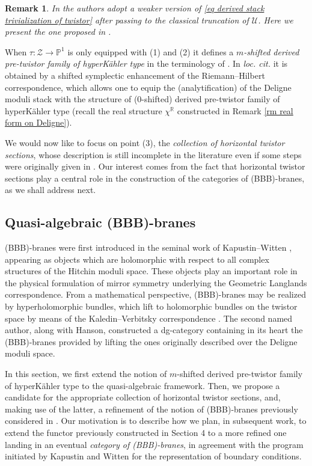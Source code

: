 \documentclass[11pt, a4paper]{amsart}
\numberwithin{equation}{section}
\newtheorem{remark}[theorem]{Remark}
\theoremstyle{definition}
\theoremstyle{remark}
\newcommand{\Uu}{\mathcal{U}}
\newcommand{\Zz}{\mathcal{Z}}
\newcommand{\RR}{\mathbb{R}}
\newcommand{\PP}{\mathbb{P}}
\renewcommand{\to}{\longrightarrow}
\begin{document}
\begin{remark}
In \cite{kryczka&tannaka&yau} the authors adopt a weaker version of \eqref{eq derived stack trivialization of twistor} after passing to the classical truncation of $\Uu$. Here we present the one proposed in \cite{KPS}.
\end{remark}


When $\tau : \Zz \to \PP^1$ is only equipped with (1) and (2) it defines a {\it $m$-shifted derived pre-twistor family of hyperKähler type} in the terminology of \cite{kryczka&tannaka&yau}. In {\it loc. cit.} it is obtained by a shifted symplectic enhancement of the Riemann--Hilbert correspondence, which allows one to equip the (analytification) of the Deligne moduli stack with the structure of ($0$-shifted) derived pre-twistor family of hyperKähler type (recall the real structure $\chi^{\RR}$ constructed in Remark \ref{rm real form on Deligne}).  




We would now like to focus on point (3), the \emph{collection of horizontal twistor sections}, whose description is still incomplete in the literature even if some steps were originally given in \cite{franco&hanson, hanson_1}. Our interest comes from the fact that horizontal twistor sections play a central role in the construction of the categories of (BBB)-branes, as we shall address next.




\subsection{Quasi-algebraic (BBB)-branes} 

(BBB)-branes were first introduced in the seminal work of Kapustin--Witten \cite{kapustin&witten}, appearing as objects which are holomorphic with respect to all complex structures of the Hitchin moduli space. These objects play an important role in the physical formulation of mirror symmetry underlying the Geometric Langlands correspondence. From a mathematical perspective, (BBB)-branes may be realized by hyperholomorphic bundles, which lift to holomorphic bundles on the twistor space by means of the Kaledin--Verbitsky correspondence \cite{kaledin&verbitsky}. The second named author, along with Hanson, constructed a dg-category \cite{franco&hanson} containing in its heart the (BBB)-branes provided by lifting the ones originally described over the Deligne moduli space. 

In this section, we first extend the notion of $m$-shifted derived pre-twistor family of hyperKähler type to the quasi-algebraic framework. Then, we propose a candidate for the appropriate collection of horizontal twistor sections, and, making use of the latter, a refinement of the notion of (BBB)-branes previously considered in \cite{franco&hanson, hanson_1}. Our motivation is to describe how we plan, in subsequent work, to extend the functor previously constructed in Section 4 to a more refined one landing in an eventual {\it category of (BBB)-branes}, in agreement with the program initiated by Kapustin and Witten for the representation of boundary conditions. 
\end{document}
